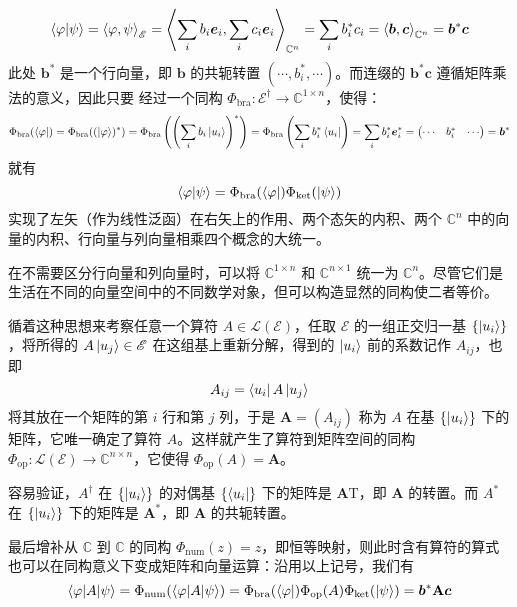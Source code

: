 \documentclass[cn,10pt,math=newtx,citestyle=gb7714-2015,bibstyle=gb7714-2015]{elegantbook}
\def\bm{\boldsymbol}
\def\mbf{\mathbf}
\def\ms{\mathscr}
\def\mc{\mathcal}
\def\C{\mathbb C}
\def\T{\mathrm T}
\def\vphi{\varphi}
\def\dg{\dagger}
\def\ra{\rightarrow}
\begin{document}
\begin{equation}
   \braket{\vphi|\psi}=\Braket{\vphi,\psi}_{\ms E}=\Braket{\sum_i b_i\bm e_i,\sum_i c_i\bm e_i}_{\C^n}=\sum_i b^*_ic_i=\Braket{\bm b,\bm c}_{\C^n} = \bm b^*\bm c
\end{equation}
此处 $\bm b^*$ 是一个行向量，即 $\bm b$ 的共轭转置 $(\cdots, b_i^*,\cdots)$。而连缀的 $\bm b^*\bm c$ 遵循矩阵乘法的意义，因此只要
经过一个同构 $\Phi_\text{bra}:\ms E^\dg\ra \C^{1\times n}$，使得：
\begin{equation}
   \Phi_\text{bra}(\bra\vphi) = \Phi_\text{bra}((\ket\vphi)^*)=\Phi_\text{bra}\left(\left(\sum_i b_i\ket{u_i}\right)^*\right)=\Phi_\text{bra}\left(\sum_i b_i^*\bra{u_i}\right)=\sum_i b_i^*\bm e_i^* = \begin{pmatrix}
   \cdots & b_i^* & \cdots
   \end{pmatrix} = \bm b^*
\end{equation}
就有
\begin{equation}
    \braket{\vphi|\psi} = \Phi_\text{bra}(\bra\vphi)\Phi_\text{ket}(\ket\psi)
\end{equation}
实现了左矢（作为线性泛函）在右矢上的作用、两个态矢的内积、两个 $\C^n$ 中的向量的内积、行向量与列向量相乘四个概念的大统一。

\begin{remark}
在不需要区分行向量和列向量时，可以将 $\C^{1\times n}$ 和 $\C^{n\times 1}$ 统一为 $\C^n$。尽管它们是生活在不同的向量空间中的不同数学对象，但可以构造显然的同构使二者等价。
\end{remark}

循着这种思想来考察任意一个算符 $A\in\mc L(\ms E)$，任取 $\ms E$ 的一组正交归一基 $\{\ket{u_i}\}$，将所得的 $A\ket{u_j}\in\ms E$ 在这组基上重新分解，得到的 $\ket{u_i}$ 前的系数记作 $A_{ij}$，也即
\begin{equation}
   A_{ij} = \bra{u_i}A\ket{u_j}
\end{equation}
将其放在一个矩阵的第 $i$ 行和第 $j$ 列，于是 $\mbf A=(A_{ij})$ 称为 $A$ 在基 $\{\ket{u_i}\}$ 下的矩阵，它唯一确定了算符 $A$。这样就产生了算符到矩阵空间的同构 $\Phi_\text{op}:\mc L(\ms E)\ra\C^{n\times n}$，它使得 $\Phi_\text{op}(A)=\mbf A$。

容易验证，$A^\dg$ 在 $\{\ket{u_i}\}$ 的对偶基  $\{\bra{u_i}\}$ 下的矩阵是 $\mbf A\T$，即 $\mbf A$ 的转置。而 $A^*$ 在 $\{\ket{u_i}\}$ 下的矩阵是 $\mbf A^*$，即 $\mbf A$ 的共轭转置。

最后增补从 $\C$ 到 $\C$ 的同构 $\Phi_\text{num}(z)=z$，即恒等映射，则此时含有算符的算式也可以在同构意义下变成矩阵和向量运算：沿用以上记号，我们有
\begin{equation}
   \braket{\vphi|A|\psi}=\Phi_\text{num}(\braket{\vphi|A|\psi}) = \Phi_\text{bra}(\bra{\vphi})\Phi_\text{op}(A)\Phi_\text{ket}(\ket{\psi})=\bm b^*\mbf A\bm c
\end{equation}
\end{document}

